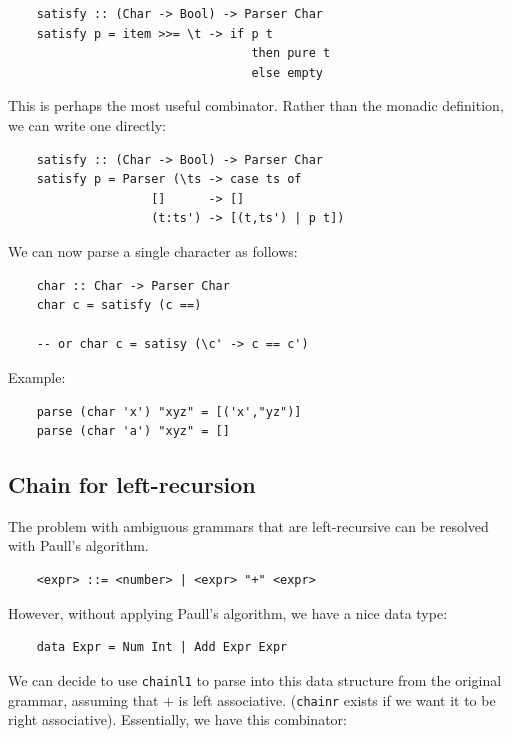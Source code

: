 \documentclass[a4paper,12pt]{article}
\theoremstyle{remark}
\begin{document}
\begin{lstlisting}
    satisfy :: (Char -> Bool) -> Parser Char
    satisfy p = item >>= \t -> if p t
                                  then pure t
                                  else empty  \end{lstlisting}

This is perhaps the most useful combinator. Rather than the monadic definition, we can write
one directly:

\begin{lstlisting}
    satisfy :: (Char -> Bool) -> Parser Char
    satisfy p = Parser (\ts -> case ts of
                    []      -> []
                    (t:ts') -> [(t,ts') | p t])  \end{lstlisting}

We can now parse a single character as follows:

\begin{lstlisting}
    char :: Char -> Parser Char
    char c = satisfy (c ==)

    -- or char c = satisy (\c' -> c == c')  \end{lstlisting}

Example:

\begin{lstlisting}
    parse (char 'x') "xyz" = [('x',"yz")]
    parse (char 'a') "xyz" = []  \end{lstlisting}


\subsection{Chain for left-recursion}

The problem with ambiguous grammars that are left-recursive can be resolved with
Paull's algorithm.

\begin{lstlisting}
    <expr> ::= <number> | <expr> "+" <expr>  \end{lstlisting}

However, without applying Paull's algorithm, we have a nice data type:

\begin{lstlisting}
    data Expr = Num Int | Add Expr Expr  \end{lstlisting}

We can decide to use \lstinline{chainl1} to parse into this data structure from the original
grammar, assuming that $+$ is left associative. (\lstinline{chainr} exists if we want it to be
right associative). Essentially, we have this combinator:
\end{document}
